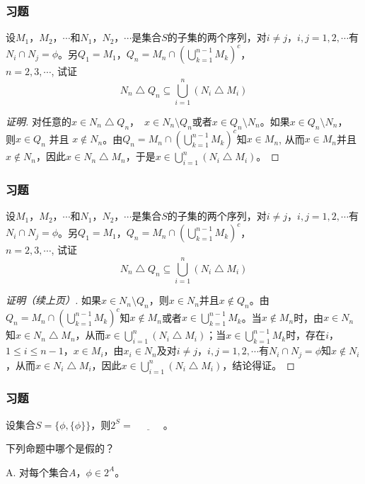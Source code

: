 \documentclass{beamer}
\begin{document}
\begin{CJK*}{UTF8}{gbsn}
\begin{frame}
  \frametitle{习题}
      设$M_1$，$M_2$，$\cdots$和$N_1$，$N_2$，$\cdots$是集合$S$的子集的两个序列，对$i \neq j$，$i, j = 1, 2, \cdots$有$N_i\cap N_j=\phi$。另$Q_1 = M_1$，$Q_n = M_n \cap (\bigcup_{k=1}^{n-1}M_k)^c$，\\$n=2,3,\cdots$, 试证
    \[N_n \bigtriangleup Q_n \subseteq \bigcup_{i=1}^n(N_i\bigtriangleup M_i)\]
  \pause
  \begin{proof}[证明]
        对任意的$x \in N_n \bigtriangleup Q_n$，　$x\in N_n \setminus Q_n$或者$x\in Q_n \setminus N_n$。如果$x\in Q_n \setminus N_n$，　则$x \in Q_n$ 并且 $x \notin N_n$。由$Q_n = M_n \cap (\bigcup_{k=1}^{n-1}M_k)^c$知$x \in M_n$, 从而$x\in M_n$并且$x\notin N_n$，因此$x \in N_n\bigtriangleup M_n$，于是$x \in \bigcup_{i=1}^n(N_i\bigtriangleup M_i)$。

  \end{proof}
\end{frame}
\begin{frame}\frametitle{习题}  
  设$M_1$，$M_2$，$\cdots$和$N_1$，$N_2$，$\cdots$是集合$S$的子集的两个序列，对$i \neq j$，$i, j = 1, 2, \cdots$有$N_i\cap N_j=\phi$。另$Q_1 = M_1$，$Q_n = M_n \cap (\bigcup_{k=1}^{n-1}M_k)^c$，
    \\$n=2,3,\cdots$, 试证
    \[N_n \bigtriangleup Q_n \subseteq \bigcup_{i=1}^n(N_i\bigtriangleup M_i)\]
  
  
  \begin{proof}[证明（续上页）]
    如果$x\in N_n \setminus Q_n$，则$x\in N_n$并且$x\notin Q_n$。由$Q_n = M_n \cap (\bigcup_{k=1}^{n-1}M_k)^c$知$x\notin M_n$或者$x\in \bigcup_{k=1}^{n-1}M_k$。当$x \notin M_n$时，由$x\in N_n$知$x \in N_n\bigtriangleup M_n$，从而$x\in \bigcup_{i=1}^n(N_i\bigtriangleup M_i)$；当$x\in \bigcup_{k=1}^{n-1}M_k$时，存在$i$，$1\leq i \leq n-1$，$x\in M_i$，由$x_i\in N_n$及对$i \neq j$，$i, j = 1, 2, \cdots$有$N_i\cap N_j=\phi$知$x\notin N_i$，从而$x\in N_i\bigtriangleup M_i$，因此$x\in \bigcup_{i=1}^n(N_i\bigtriangleup M_i)$，结论得证。    
  \end{proof}
\end{frame}
\begin{frame}
  \frametitle{习题}
    \begin{Exercise}
   设集合$S=\{\phi, \{\phi\}\}$，则$2^S=\underline{\quad\quad\quad}$。
  \end{Exercise}
  \begin{Exercise}
    下列命题中哪个是假的？

    A. 对每个集合$A$，$\phi \in 2^A$。


\end{Exercise}
\end{frame}
\end{CJK*}
\end{document}

